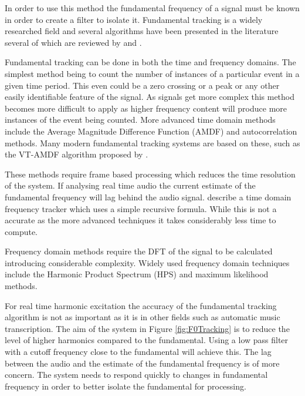 		In order to use this method the fundamental frequency of a signal must be known in order to create a filter
		to isolate it. Fundamental tracking is a widely researched field and several algorithms have been presented
		in the literature several of which are reviewed by \citet{cuadra2001efficient} and
		\citet{gerhard2003pitch}.

		Fundamental tracking can be done in both the time and frequency domains. The simplest method being to count
		the number of instances of a particular event in a given time period. This even could be a zero crossing or
		a peak or any other easily identifiable feature of the signal. As signals get more complex this method
		becomes more difficult to apply as higher frequency content will produce more instances of the event being
		counted. More advanced time domain methods include the Average Magnitude Difference Function (AMDF) and
		autocorrelation methods. Many modern fundamental tracking systems are based on these, such as the VT-AMDF
		algorithm proposed by \citet{prukkanon2009vt-amdf}.

		These methods require frame based processing which reduces the time resolution of the system. If analysing
		real time audio the current estimate of the fundamental frequency will lag behind the audio signal.
		\citet{larsen2004audio} describe a time domain frequency tracker which uses a simple recursive formula.
		While this is not a accurate as the more advanced techniques it takes considerably less time to compute.

		Frequency domain methods require the DFT of the signal to be calculated introducing considerable
		complexity. Widely used frequency domain techniques include the Harmonic Product Spectrum (HPS) and maximum
		likelihood methods.

		For real time harmonic excitation the accuracy of the fundamental tracking algorithm is not as important as
		it is in other fields such as automatic music transcription. The aim of the system in Figure
		\ref{fig:F0Tracking} is to reduce the level of higher harmonics compared to the fundamental. Using a low
		pass filter with a cutoff frequency close to the fundamental will achieve this. The lag between the audio
		and the estimate of the fundamental frequency is of more concern. The system needs to respond quickly to
		changes in fundamental frequency in order to better isolate the fundamental for processing.

